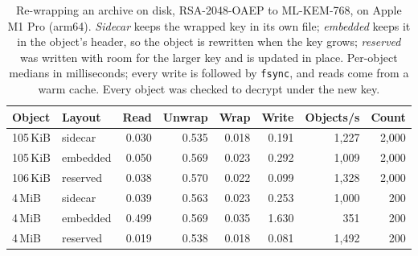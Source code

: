 \begin{table}[t]
\caption{Re-wrapping an archive on disk, RSA-2048-OAEP to ML-KEM-768, on Apple M1 Pro (arm64). \emph{Sidecar} keeps the wrapped key in its own file; \emph{embedded} keeps it in the object's header, so the object is rewritten when the key grows; \emph{reserved} was written with room for the larger key and is updated in place. Per-object medians in milliseconds; every write is followed by \texttt{fsync}, and reads come from a warm cache. Every object was checked to decrypt under the new key.}
\label{tab:rewrap}
\begin{tabular}{llrrrrrr}
\toprule
Object & Layout & Read & Unwrap & Wrap & Write & Objects/s & Count\\
\midrule
105\,KiB & sidecar & 0.030 & 0.535 & 0.018 & 0.191 & 1,227 & 2,000\\
105\,KiB & embedded & 0.050 & 0.569 & 0.023 & 0.292 & 1,009 & 2,000\\
106\,KiB & reserved & 0.038 & 0.570 & 0.022 & 0.099 & 1,328 & 2,000\\
\midrule
4\,MiB & sidecar & 0.039 & 0.563 & 0.023 & 0.253 & 1,000 & 200\\
4\,MiB & embedded & 0.499 & 0.569 & 0.035 & 1.630 & 351 & 200\\
4\,MiB & reserved & 0.019 & 0.538 & 0.018 & 0.081 & 1,492 & 200\\
\bottomrule
\end{tabular}
\end{table}
